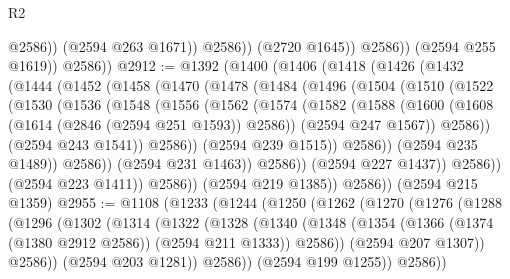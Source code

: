 \begin{lexlean}{R2}
\begin{coremodule}
                          @2586))
                      (@2594 @263 @1671))
                    @2586))
                (@2720 @1645))
              @2586))
          (@2594 @255 @1619))
        @2586))
@2912 := @1392
    (@1400
      (@1406
        (@1418
          (@1426
            (@1432
              (@1444
                (@1452
                  (@1458
                    (@1470
                      (@1478
                        (@1484
                          (@1496
                            (@1504
                              (@1510
                                (@1522
                                  (@1530
                                    (@1536
                                      (@1548
                                        (@1556
                                          (@1562
                                            (@1574
                                              (@1582
                                                (@1588
                                                  (@1600
                                                    (@1608 (@1614 (@2846 (@2594 @251 @1593)) @2586))
                                                    (@2594 @247 @1567))
                                                  @2586))
                                              (@2594 @243 @1541))
                                            @2586))
                                        (@2594 @239 @1515))
                                      @2586))
                                  (@2594 @235 @1489))
                                @2586))
                            (@2594 @231 @1463))
                          @2586))
                      (@2594 @227 @1437))
                    @2586))
                (@2594 @223 @1411))
              @2586))
          (@2594 @219 @1385))
        @2586))
    (@2594 @215 @1359)
@2955 := @1108
    (@1233
      (@1244
        (@1250
          (@1262
            (@1270
              (@1276
                (@1288
                  (@1296
                    (@1302
                      (@1314
                        (@1322
                          (@1328
                            (@1340
                              (@1348
                                (@1354
                                  (@1366 (@1374 (@1380 @2912 @2586)) (@2594 @211 @1333))
                                  @2586))
                              (@2594 @207 @1307))
                            @2586))
                        (@2594 @203 @1281))
                      @2586))
                  (@2594 @199 @1255))
                @2586))

\end{coremodule}
\end{lexlean}

